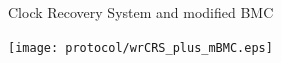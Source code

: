 \documentclass[compress,red]{beamer}
\begin{document}
% 
% 
% 
% 
% 
% 
\begin{frame}{Clock Recovery System and modified BMC}


  \begin{center}
  \texttt{[image: protocol/wrCRS\_plus\_mBMC.eps]}
  \end{center}

\end{frame}
\end{document}
